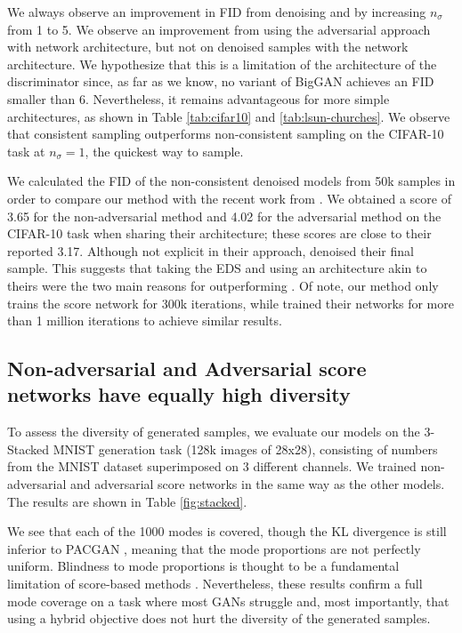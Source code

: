 \documentclass{article} \usepackage{iclr2021_conference_notitle,times}
\theoremstyle{definition}
\theoremstyle{definition}
\begin{document}
We always observe an improvement in FID from denoising and by increasing $n_\sigma$ from 1 to 5. 
We observe an improvement from using the adversarial approach with \citet{song2019generative} network architecture, but not on denoised samples with the \citet{ho2020denoising} network architecture. We hypothesize that this is a limitation of the architecture of the discriminator since, as far as we know, no variant of BigGAN achieves an FID smaller than 6. Nevertheless, it remains advantageous for more simple architectures, as shown in Table \ref{tab:cifar10} and \ref{tab:lsun-churches}. We observe that consistent sampling outperforms non-consistent sampling on the CIFAR-10 task at $n_\sigma = 1$, the quickest way to sample. 


We calculated the FID of the non-consistent denoised models from 50k samples in order to compare our method with the recent work from \citet{ho2020denoising}. We obtained a score of 3.65 for the non-adversarial method and 4.02 for the adversarial method on the CIFAR-10 task when sharing their architecture; these scores are close to their reported 3.17. Although not explicit in their approach, \citet{ho2020denoising} denoised their final sample. This suggests that taking the EDS and using an architecture akin to theirs were the two main reasons for outperforming \citet{song2020improved}.  Of note, our method only trains the score network for 300k iterations, while \citet{ho2020denoising} trained their networks for more than 1 million iterations to achieve similar results.

\subsection{Non-adversarial and Adversarial score networks have equally high diversity}\label{sec:diversity}

To assess the diversity of generated samples, we evaluate our models on the 3-Stacked MNIST generation task \citep{metz2016unrolled} (128k images of 28x28), consisting of numbers from the MNIST dataset \citep{lecun1998gradient} superimposed on 3 different channels. We trained non-adversarial and adversarial score networks in the same way as the other models. The results are shown in Table \ref{fig:stacked}. 

We see that each of the 1000 modes is covered, though the KL divergence is still inferior to PACGAN \citep{lin2018pacgan}, meaning that the mode proportions are not perfectly uniform. Blindness to mode proportions is thought to be a fundamental limitation of score-based methods \citep{wenliang2020blindness}. Nevertheless, these results confirm a full mode coverage on a task where most GANs struggle and, most importantly, that using a hybrid objective does not hurt the diversity of the generated samples.
\end{document}
